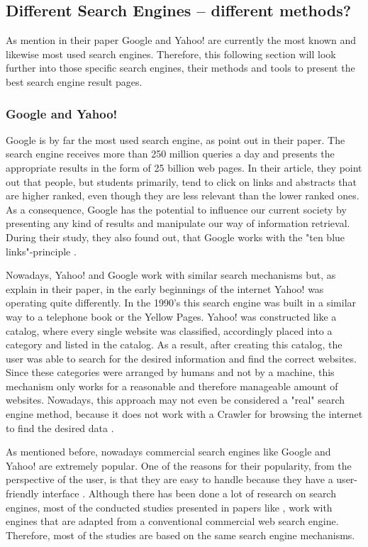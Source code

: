 \subsection{Different Search Engines -- different methods?}
\label{subsection:SearchEngine}
As \textcite{pan2007google, agrawal2015study} mention in their paper Google and Yahoo! are currently the most known and likewise most used search engines. Therefore, this following section will look further into those specific search engines, their methods and tools to present the best search engine result pages. 

\subsubsection{Google and Yahoo!}
Google is by far the most used search engine, as \textcite{pan2007google} point out in their paper. The search engine receives more than 250 million queries a day and presents the appropriate results in the form of 25 billion web pages. In their article, they point out that people, but students primarily, tend to click on links and abstracts that are higher ranked, even though they are less relevant than the lower ranked ones. As a consequence, Google has the potential to influence our current society by presenting any kind of results and manipulate our way of information retrieval. During their study, they also found out, that Google works with the "ten blue links"-principle \autocite{pan2007google}.

Nowadays, Yahoo! and Google work with similar search mechanisms but, as \textcite{weber2011search} explain in their paper, in the early beginnings of the internet Yahoo! was operating quite differently. 
In the 1990's this search engine was built in a similar way to a telephone book or the Yellow Pages. Yahoo! was constructed like a catalog, where every single website was classified, accordingly placed into a category and listed in the catalog. As a result, after creating this catalog, the user was able to search for the desired information and find the correct websites. Since these categories were arranged by humans and not by a machine, this mechanism only works for a reasonable and therefore manageable amount of websites. Nowadays, this approach may not even be considered a "real" search engine method, because it does not work with a Crawler for browsing the internet to find the desired data \autocite{weber2011search}.

As mentioned before, nowadays commercial search engines like Google and Yahoo! are extremely popular. One of the reasons for their popularity, from the perspective of the user, is that they are easy to handle because they have a user-friendly interface \autocite{pan2007google}. 
Although there has been done a lot of research on search engines, most of the conducted studies presented in papers like \textcite{liu2015influence, buscher2010good}, work with engines that are adapted from a conventional commercial web search engine. Therefore, most of the studies are based on the same search engine mechanisms.

